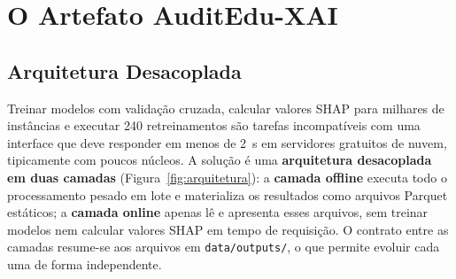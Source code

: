 \section{O Artefato AuditEdu-XAI}
\label{sec:artefato}

\subsection{Arquitetura Desacoplada}
\label{sec:arquitetura}

Treinar modelos com validação cruzada, calcular valores SHAP para milhares de instâncias e executar 240 retreinamentos são tarefas incompatíveis com uma interface que deve responder em menos de 2~s em servidores gratuitos de nuvem, tipicamente com poucos núcleos. A solução é uma \textbf{arquitetura desacoplada em duas camadas} (Figura~\ref{fig:arquitetura}): a \textbf{camada offline} executa todo o processamento pesado em lote e materializa os resultados como arquivos Parquet estáticos; a \textbf{camada online} apenas lê e apresenta esses arquivos, sem treinar modelos nem calcular valores SHAP em tempo de requisição. O contrato entre as camadas resume-se aos arquivos em \texttt{data/outputs/}, o que permite evoluir cada uma de forma independente.

